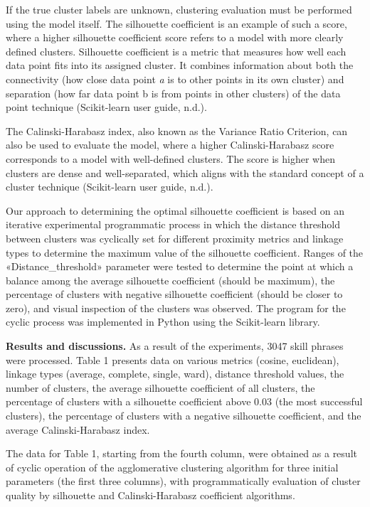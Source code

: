 \begin{multicols}{2}
If the true cluster labels are unknown, clustering evaluation must be
performed using the model itself. The silhouette coefficient is an
example of such a score, where a higher silhouette coefficient score
refers to a model with more clearly defined clusters. Silhouette
coefficient is a metric that measures how well each data point fits into
its assigned cluster. It combines information about both the
connectivity (how close data point \emph{a} is to other points in its
own cluster) and separation (how far data point b is from points in
other clusters) of the data point technique (Scikit-learn user guide,
n.d.).

The Calinski-Harabasz index, also known as the Variance Ratio Criterion,
can also be used to evaluate the model, where a higher Calinski-Harabasz
score corresponds to a model with well-defined clusters. The score is
higher when clusters are dense and well-separated, which aligns with the
standard concept of a cluster technique (Scikit-learn user guide, n.d.).

Our approach to determining the optimal silhouette coefficient is based
on an iterative experimental programmatic process in which the distance
threshold between clusters was cyclically set for different proximity
metrics and linkage types to determine the maximum value of the
silhouette coefficient. Ranges of the «Distance\_threshold» parameter
were tested to determine the point at which a balance among the average
silhouette coefficient (should be maximum), the percentage of clusters
with negative silhouette coefficient (should be closer to zero), and
visual inspection of the clusters was observed. The program for the
cyclic process was implemented in Python using the Scikit-learn library.

{\bfseries Results and discussions.} As a result of the experiments, 3047
skill phrases were processed. Table 1 presents data on various metrics
(cosine, euclidean), linkage types (average, complete, single, ward),
distance threshold values, the number of clusters, the average
silhouette coefficient of all clusters, the percentage of clusters with
a silhouette coefficient above 0.03 (the most successful clusters), the
percentage of clusters with a negative silhouette coefficient, and the
average Calinski-Harabasz index.

The data for Table 1, starting from the fourth column, were obtained as
a result of cyclic operation of the agglomerative clustering algorithm
for three initial parameters (the first three columns), with
programmatically evaluation of cluster quality by silhouette and
Calinski-Harabasz coefficient algorithms.
\end{multicols}

